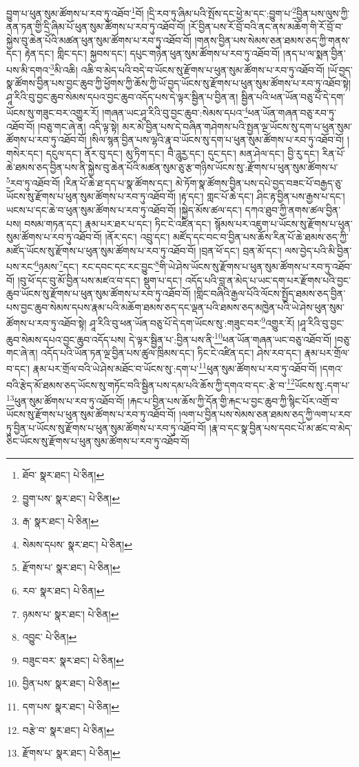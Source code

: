 བྱུག་པ་ཕུན་སུམ་ཚོགས་པ་རབ་ཏུ་འཐོབ་\footnote{ཐོབ་  སྣར་ཐང་།  པེ་ཅིན། }བོ། །དྲི་རབ་ཏུ་ཞིམ་པའི་སྤོས་དང་ཕྱེ་མ་དང་:བྱུག་པ་\footnote{བྱུག་པས་  སྣར་ཐང་།  པེ་ཅིན། }བྱིན་པས་ལུས་ཀྱི་ནན་ཏན་གྱི་དྲི་ཞིམ་པོ་ཕུན་སུམ་ཚོགས་པ་རབ་ཏུ་འཐོབ་བོ། །རོ་བྱིན་པས་རོ་བྲོ་བའི་ནང་ནས་མཆོག་གི་རོ་བྲོ་བ་སྐྱེས་བུ་ཆེན་པོའི་མཚན་ཕུན་སུམ་ཚོགས་པ་རབ་ཏུ་འཐོབ་བོ། །གནས་བྱིན་པས་སེམས་ཅན་ཐམས་ཅད་ཀྱི་གནས་དང་། རྟེན་དང་། གླིང་དང་། སྐྱབས་དང་། དཔུང་གཉེན་ཕུན་སུམ་ཚོགས་པ་རབ་ཏུ་འཐོབ་བོ། །ནད་པ་ལ་སྨན་བྱིན་པས་མི་དགའ་\footnote{རྒ་  སྣར་ཐང་།  པེ་ཅིན། }མི་འཆི། འཆི་བ་མེད་པའི་བདེ་བ་ཡོངས་སུ་རྫོགས་པ་ཕུན་སུམ་ཚོགས་པ་རབ་ཏུ་འཐོབ་བོ། །ཡོ་བྱད་སྣ་ཚོགས་བྱིན་པས་བྱང་ཆུབ་ཀྱི་ཕྱོགས་ཀྱི་ཆོས་ཀྱི་ཡོ་བྱད་ཡོངས་སུ་རྫོགས་པ་ཕུན་སུམ་ཚོགས་པ་རབ་ཏུ་འཐོབ་སྟེ། ཤཱ་རིའི་བུ་བྱང་ཆུབ་སེམས་དཔའ་བྱང་ཆུབ་འདོད་པས་དེ་ལྟར་སྦྱིན་པ་བྱིན་ན། སྦྱིན་པའི་ཕན་ཡོན་བཅུ་པོ་དེ་དག་ཡོངས་སུ་གཟུང་བར་འགྱུར་རོ། །གཞན་ཡང་ཤཱ་རིའི་བུ་བྱང་ཆུབ་:སེམས་དཔའ་\footnote{སེམས་དཔས་  སྣར་ཐང་།  པེ་ཅིན། }ཕན་ཡོན་གཞན་བཅུ་རབ་ཏུ་འཐོབ་བོ། །བཅུ་གང་ཞེ་ན། འདི་ལྟ་སྟེ། མར་མེ་བྱིན་པས་དེ་བཞིན་གཤེགས་པའི་སྤྱན་ལྔ་ཡོངས་སུ་དག་པ་ཕུན་སུམ་ཚོགས་པ་རབ་ཏུ་འཐོབ་བོ། །སིལ་སྙན་བྱིན་པས་ལྷའི་རྣ་བ་ཡོངས་སུ་དག་པ་ཕུན་སུམ་ཚོགས་པ་རབ་ཏུ་འཐོབ་བོ། །གསེར་དང་། དངུལ་དང་། ནོར་བུ་དང་། མུ་ཏིག་དང་། བཻ་ཌཱུརྱ་དང་། དུང་དང་། མན་ཤེལ་དང་། བྱི་རུ་དང་། རིན་པོ་ཆེ་ཐམས་ཅད་བྱིན་པས་ནི་སྐྱེས་བུ་ཆེན་པོའི་མཚན་སུམ་ཅུ་རྩ་གཉིས་ཡོངས་སུ་:རྫོགས་པ་ཕུན་སུམ་ཚོགས་པ་\footnote{རྫོགས་པ་  སྣར་ཐང་།  པེ་ཅིན། }རབ་ཏུ་འཐོབ་བོ། །རིན་པོ་ཆེ་ཐ་དད་པ་སྣ་ཚོགས་དང་། མེ་ཏོག་སྣ་ཚོགས་བྱིན་པས་དཔེ་བྱད་བཟང་པོ་བརྒྱད་ཅུ་ཡོངས་སུ་རྫོགས་པ་ཕུན་སུམ་ཚོགས་པ་རབ་ཏུ་འཐོབ་བོ། །རྟ་དང་། གླང་པོ་ཆེ་དང་། ཤིང་རྟ་བྱིན་པས་རྒྱས་པ་དང་། ཡངས་པ་དང་ཆེ་བ་ཕུན་སུམ་ཚོགས་པ་རབ་ཏུ་འཐོབ་བོ། །སྐྱེད་མོས་ཚལ་དང་། དཀའ་ཐུབ་ཀྱི་ནགས་ཚལ་བྱིན་པས། བསམ་གཏན་དང་། རྣམ་པར་ཐར་པ་དང་། ཏིང་ངེ་འཛིན་དང་། སྙོམས་པར་འཇུག་པ་ཡོངས་སུ་རྫོགས་པ་ཕུན་སུམ་ཚོགས་པ་རབ་ཏུ་འཐོབ་བོ། །ནོར་དང་། འབྲུ་དང་། མཛོད་དང་བང་བ་བྱིན་པས་ཆོས་རིན་པོ་ཆེ་ཐམས་ཅད་ཀྱི་མཛོད་ཡོངས་སུ་རྫོགས་པ་ཕུན་སུམ་ཚོགས་པ་རབ་ཏུ་འཐོབ་བོ། །བྲན་ཕོ་དང་། བྲན་མོ་དང་། ལས་བྱེད་པའི་མི་བྱིན་པས་རང་\footnote{རབ་  སྣར་ཐང་།  པེ་ཅིན། }ཉམས་\footnote{ཉམས་པ་  སྣར་ཐང་།  པེ་ཅིན། }དང་། རང་དབང་དང་རང་བྱུང་\footnote{འབྱུང་  པེ་ཅིན། }གི་ཡེ་ཤེས་ཡོངས་སུ་རྫོགས་པ་ཕུན་སུམ་ཚོགས་པ་རབ་ཏུ་འཐོབ་བོ། །བུ་ཕོ་དང་བུ་མོ་བྱིན་པས་མཛའ་བ་དང་། སྡུག་པ་དང་། འདོད་པའི་བླ་ན་མེད་པ་ཡང་དག་པར་རྫོགས་པའི་བྱང་ཆུབ་ཡོངས་སུ་རྫོགས་པ་ཕུན་སུམ་ཚོགས་པ་རབ་ཏུ་འཐོབ་བོ། །གླིང་བཞིའི་རྒྱལ་པོའི་ལོངས་སྤྱོད་ཐམས་ཅད་བྱིན་པས་བྱང་ཆུབ་སེམས་དཔས་རྣམ་པའི་མཆོག་ཐམས་ཅད་དང་ལྡན་པའི་ཐམས་ཅད་མཁྱེན་པའི་ཡེ་ཤེས་ཕུན་སུམ་ཚོགས་པ་རབ་ཏུ་འཐོབ་སྟེ། ཤཱ་རིའི་བུ་ཕན་ཡོན་བཅུ་པོ་དེ་དག་ཡོངས་སུ་:གཟུང་བར་\footnote{བཟུང་བར་  སྣར་ཐང་།  པེ་ཅིན། }འགྱུར་རོ། །ཤཱ་རིའི་བུ་བྱང་ཆུབ་སེམས་དཔའ་བྱང་ཆུབ་འདོད་པས། དེ་ལྟར་སྦྱིན་པ་:བྱིན་པས་ནི་\footnote{བྱིན་པས་  སྣར་ཐང་།  པེ་ཅིན། }ཕན་ཡོན་གཞན་ཡང་བཅུ་འཐོབ་བོ། །བཅུ་གང་ཞེ་ན། འདོད་པའི་ཡོན་ཏན་ལྔ་བྱིན་པས་ཚུལ་ཁྲིམས་དང་། ཏིང་ངེ་འཛིན་དང་། ཤེས་རབ་དང་། རྣམ་པར་གྲོལ་བ་དང་། རྣམ་པར་གྲོལ་བའི་ཡེ་ཤེས་མཐོང་བ་ཡོངས་སུ་:དག་པ་\footnote{དག་པས་  སྣར་ཐང་།  པེ་ཅིན། }ཕུན་སུམ་ཚོགས་པ་རབ་ཏུ་འཐོབ་བོ། །དགའ་བའི་རྩེད་མོ་ཐམས་ཅད་ཡོངས་སུ་གཏོང་བའི་སྦྱིན་པས་དམ་པའི་ཆོས་ཀྱི་དགའ་བ་དང་:རྩེ་བ་\footnote{བརྩེ་བ་  སྣར་ཐང་།  པེ་ཅིན། }ཡོངས་སུ་:དག་པ་\footnote{རྫོགས་པ་  སྣར་ཐང་།  པེ་ཅིན། }ཕུན་སུམ་ཚོགས་པ་རབ་ཏུ་འཐོབ་བོ། །རྐང་པ་བྱིན་པས་ཆོས་ཀྱི་དོན་གྱི་རྐང་པ་བྱང་ཆུབ་ཀྱི་སྙིང་པོར་འགྲོ་བ་ཡོངས་སུ་རྫོགས་པ་ཕུན་སུམ་ཚོགས་པ་རབ་ཏུ་འཐོབ་བོ། །ལག་པ་བྱིན་པས་སེམས་ཅན་ཐམས་ཅད་ཀྱི་ལག་པ་རབ་ཏུ་བྱིན་པ་ཡོངས་སུ་རྫོགས་པ་ཕུན་སུམ་ཚོགས་པ་རབ་ཏུ་འཐོབ་བོ། །རྣ་བ་དང་སྣ་བྱིན་པས་དབང་པོ་མ་ཚང་བ་མེད་ཅིང་ཡོངས་སུ་རྫོགས་པ་ཕུན་སུམ་ཚོགས་པ་རབ་ཏུ་འཐོབ་བོ། 